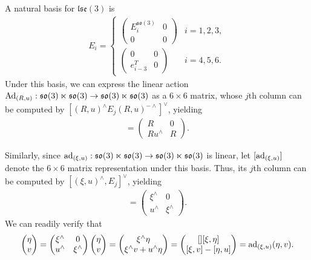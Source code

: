 \documentclass[12pt,class=article,crop=false]{standalone}
\begin{document}
A natural basis for $ \mathfrak{lse}(3) $ is
 \begin{align*}
	E_i = \begin{cases}
		\begin{pmatrix} E_i^{ \mathfrak{so}(3)}&0\\0&0 \end{pmatrix} & i = 1,2,3,\\
		\begin{pmatrix} 0& 0 \\ e_{i-3}^{T} & 0 \end{pmatrix} & i = 4,5,6 . 
	\end{cases}
\end{align*}
Under this basis, we can express the linear action $ \operatorname{Ad}_{ (R,u)} : \mathfrak{so}(3) \ltimes \mathfrak{so}(3) \to \mathfrak{so}(3) \ltimes \mathfrak{so}(3) $ as a $ 6\times 6$ matrix, whose $ j$th column can be computed by  $ [(R,u)^\wedge  E_j (R,u)^{-\wedge } ]^\vee$, yielding
\begin{align*}
	[ \Ad_{ (R,u)}] = \begin{pmatrix} R &0\\ Ru^\wedge &R \end{pmatrix} .
\end{align*}

Similarly, since $ \operatorname{ad}_{ (\xi,u)}: \mathfrak{so}(3) \ltimes \mathfrak{so}(3) \to \mathfrak{so}(3) \ltimes \mathfrak{so}(3) $ is linear, let $ [\operatorname{ad}_{ (\xi,u)}]$ denote the $ 6 \times 6$ matrix representation under this basis. Thus, its $ j$th column can be computed by $ [(\xi,u)^\wedge, E_j]^\vee$, yielding
\begin{align*}
	[ \ad_{ (\xi,u)}] = \begin{pmatrix} \xi^\wedge &0\\ u^\wedge & \xi^\wedge  \end{pmatrix} .
\end{align*}
We can readily verify that
\begin{align*}
	[ \ad_{ (\xi,u)}] \begin{pmatrix} \eta \\ v \end{pmatrix} = \begin{pmatrix} \xi^\wedge &0\\ u^\wedge & \xi^\wedge  \end{pmatrix}  \begin{pmatrix} \eta \\ v \end{pmatrix} = \begin{pmatrix} \xi^\wedge \eta \\ \xi^\wedge v + u^\wedge  \eta \end{pmatrix} = \begin{pmatrix}[] [\xi, \eta] \\ [\xi,v] - [\eta, u] \end{pmatrix}  = \ad_{ ( \xi,u)} (\eta,v) .
\end{align*}
\end{document}

